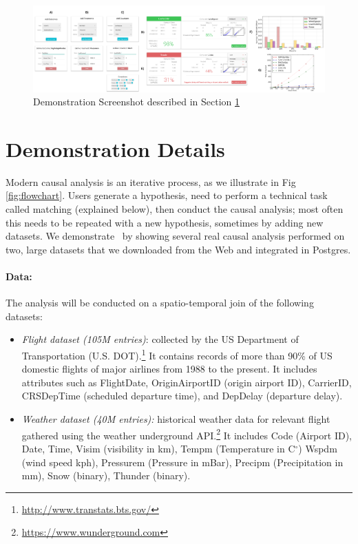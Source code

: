 \begin{figure}
\centering
\includegraphics[scale=0.13]{Figures/Demo-Tutorial-2.png}
\caption{Demonstration Screenshot described in Section  \ref{sec:dd}}
\label{sfig:demo-tutorial}
\end{figure}


\section{Demonstration Details}
\label{sec:dd}
Modern causal analysis is an iterative process, as we illustrate in Fig \ref{fig:flowchart}.
Users generate a hypothesis, need to perform a technical task called matching (explained below),
  then conduct the causal analysis; most often this needs to be repeated with a new hypothesis,
  sometimes by adding new datasets.
We demonstrate \GSQL\ by showing several real causal analysis performed on two,
  large datasets that we downloaded from the Web and integrated in Postgres.


    \paragraph{\bf Data:} The analysis will be conducted on a spatio-temporal join of the following datasets:
 \begin{itemize}
   \item {\it Flight dataset (105M entries)}: collected by the US
Department of Transportation (U.S. DOT).\footnote{\url{http://www.transtats.bts.gov/}} It contains
records of more than 90\% of US domestic flights of major airlines
from 1988 to the present. It includes attributes such as FlightDate, OriginAirportID (origin airport ID), CarrierID, CRSDepTime (scheduled departure time), and DepDelay (departure delay).
   \item {\it Weather dataset (40M entries):} historical weather data for relevant flight gathered using the weather underground API.\footnote{\url{https://www.wunderground.com}} It includes Code (Airport ID),
Date, Time,  Visim (visibility in km),
  Tempm (Temperature in C$^{\circ}$)
  Wspdm (wind speed kph), Pressurem (Pressure in mBar), Precipm  (Precipitation in mm), Snow (binary), Thunder (binary).
 \end{itemize}






